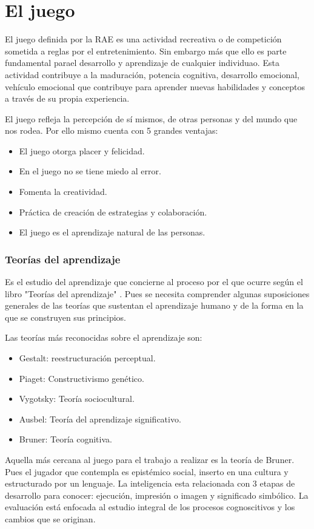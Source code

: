 \section{El juego}\label{juego}
El juego definida por la RAE es una actividad  recreativa o de competición sometida a reglas por el entretenimiento. Sin embargo más que ello es parte fundamental parael desarrollo y aprendizaje de cualquier individuao. Esta actividad contribuye a la maduración, potencia cognitiva, desarrollo emocional, vehículo emocional que contribuye para aprender nuevas habilidades y conceptos a través de su propia experiencia.

El juego refleja la percepción de sí mismos, de otras personas y del mundo que nos rodea. Por ello mismo cuenta con 5 grandes ventajas:
\begin{itemize}
	\item El juego otorga placer y felicidad.
	\item En el juego no se tiene miedo al error.
	\item Fomenta la creatividad.
	\item Práctica de creación de estrategias y colaboración.
	\item El juego es el aprendizaje natural de las personas.
\end{itemize}
	
\subsubsection{Teorías del aprendizaje}
Es el estudio del aprendizaje que concierne al proceso por el que ocurre según el libro "Teorías del aprendizaje" \cite{libroTeoApr}. Pues se necesita comprender algunas suposiciones generales de las teorías que sustentan el aprendizaje humano y de la forma en la que se construyen sus principios.

Las teorías más reconocidas sobre el aprendizaje son:
\begin{itemize}
	\item Gestalt: reestructuración perceptual.
	\item Piaget: Constructivismo genético.
	\item Vygotsky: Teoría sociocultural.
	\item Ausbel: Teoría del aprendizaje significativo.
	\item Bruner: Teoría cognitiva.
\end{itemize}

Aquella más cercana al juego para el trabajo a realizar es la teoría de Bruner. Pues el jugador que contempla es epistémico social, inserto en una cultura y estructurado por un lenguaje. La inteligencia esta relacionada con 3 etapas de desarrollo para conocer: ejecución, impresión o imagen y significado simbólico. La evaluación está enfocada al estudio integral de los procesos cognoscitivos y los cambios que se originan.

